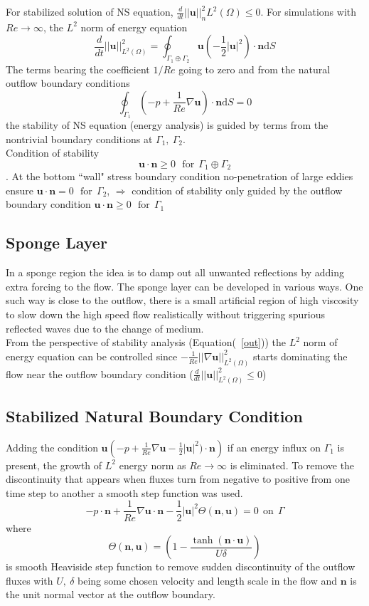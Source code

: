 For stabilized solution of NS equation, $\frac{d}{dt}\vert\vert \pmb{u} \vert\vert^2_n{L^{2}(\Omega)} \leq 0$. For simulations with $Re \rightarrow \infty$, the  $L^{2}$ norm of energy equation 
\begin{equation}
\frac{d}{dt}\vert\vert \pmb{u} \vert\vert^2_{L^{2}(\Omega)} = 
  \oint_{\Gamma_1 \oplus \Gamma_2}\pmb{u}(- \frac{1}{2}\vert  \pmb{u}\vert^2)\cdot \pmb{n}\mbox{d}S
\end{equation}
The terms bearing the coefficient ${1}/{Re}$ going to zero and from the natural outflow boundary conditions $$  \oint_{\Gamma_1}\left(-p + \frac{1}{Re}\nabla \pmb{u} \right)\cdot \pmb{n}\mbox{d}S = 0 $$ the stability of NS equation (energy analysis) is guided by terms from the nontrivial boundary conditions at $\Gamma_1, \ \Gamma_2$. \\
Condition of stability $$ \pmb{u} \cdot \pmb{n} \geq 0 \ \ \ \mbox{for}\ \ \Gamma_1 \oplus \Gamma_2$$.
At the bottom ``wall" stress boundary condition no-penetration of large eddies ensure $\pmb{u} \cdot \pmb{n} = 0 \ \ \ \mbox{for}\ \ \Gamma_2$, $\Rightarrow$ condition of stability only guided by the outflow boundary condition $\pmb{u} \cdot \pmb{n} \geq 0 \ \ \ \mbox{for}\ \ \Gamma_1$
\subsection{Sponge Layer}
In a sponge region the idea is to damp out all unwanted reflections by adding extra forcing to the flow. The sponge layer can be developed in various ways. One such way is close to the outflow, there is a small artificial region of high viscosity to slow down the high speed flow realistically without triggering spurious reflected waves due to the change of medium.\\
 From the perspective of stability analysis (Equation(~\ref{out})) the  $L^{2}$ norm of energy equation can be controlled since $-\frac{1}{Re}\vert\vert\nabla \pmb{u}\vert\vert^2_{L^{2}(\Omega)}$ starts dominating the flow near the outflow boundary condition ($\frac{d}{dt}\vert\vert \pmb{u} \vert\vert^2_{L^{2}(\Omega)} \leq 0$)
\subsection{Stabilized Natural Boundary Condition}  
Adding the condition $\pmb{u} \left(-p + \frac{1}{Re}\nabla \pmb{u} - \frac{1}{2}\vert \pmb{u}\vert^2)\cdot \pmb{n}\right)$ if an energy influx on $\Gamma_1$ is present, the growth of $L^2$ energy norm as $Re \rightarrow \infty$ is eliminated. To remove the discontinuity that appears when fluxes turn from negative to positive from one time step to another a smooth step function was used.
\begin{equation}
\boxed{-p\cdot \pmb{n} + \frac{1}{Re}\nabla  \pmb{u} \cdot \pmb{n} - \frac{1}{2}\vert \pmb{u} \vert ^{2}\Theta (\pmb{n},\pmb{u}) = 0 \ \ \mbox{on} \ \ \Gamma} \label{nbc2}
\end{equation}
where
$$ \Theta (\pmb{n},\pmb{u}) = \left(1 - \frac{\tanh(\pmb{n} \cdot \pmb{u})}{U\delta}\right)$$ is smooth Heaviside step function to remove sudden discontinuity of the outflow fluxes with $U, \ \delta$ being some chosen velocity and length scale in the flow and $\pmb{n}$ is the unit normal vector at the outflow boundary. 
